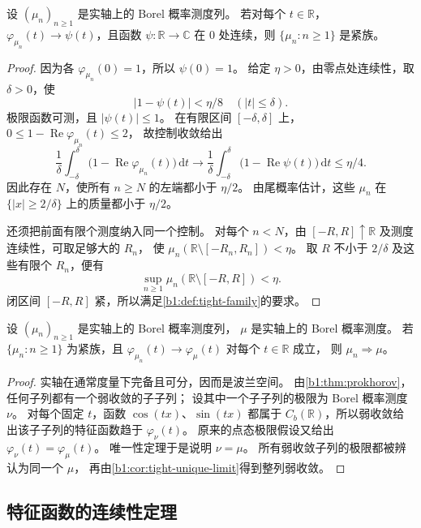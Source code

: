 \begin{lemma}\label{b1:lem:30-characteristic-tightness}
设 \((\mu_n)_{n\geq1}\) 是实轴上的 Borel 概率测度列。
若对每个 \(t\in\mathbb R\)，
\(\varphi_{\mu_n}(t)\to\psi(t)\)，且函数 \(\psi:\mathbb R\to\mathbb C\)
在 \(0\) 处连续，则 \(\{\mu_n:n\geq1\}\) 是紧族。
\end{lemma}
\begin{proof}
因为各 \(\varphi_{\mu_n}(0)=1\)，所以 \(\psi(0)=1\)。
给定 \(\eta>0\)，由零点处连续性，取 \(\delta>0\)，使
\[
 |1-\psi(t)|<\eta/8\quad(|t|\leq\delta).
\]
极限函数可测，且 \(|\psi(t)|\leq1\)。
在有限区间 \([-\delta,\delta]\) 上，
\(0\leq1-\operatorname{Re}\varphi_{\mu_n}(t)\leq2\)，
故控制收敛给出
\[
 \frac{1}{\delta}\int_{-\delta}^{\delta}
       \bigl(1-\operatorname{Re}\varphi_{\mu_n}(t)\bigr)\,\mathrm dt
 \longrightarrow
 \frac{1}{\delta}\int_{-\delta}^{\delta}
       \bigl(1-\operatorname{Re}\psi(t)\bigr)\,\mathrm dt
 \leq\eta/4.
\]
因此存在 \(N\)，使所有 \(n\geq N\) 的左端都小于 \(\eta/2\)。
由尾概率估计，这些 \(\mu_n\) 在
\(\{|x|\geq2/\delta\}\) 上的质量都小于 \(\eta/2\)。

还须把前面有限个测度纳入同一个控制。
对每个 \(n<N\)，由
\([-R,R]\uparrow\mathbb R\) 及测度连续性，可取足够大的 \(R_n\)，
使 \(\mu_n(\mathbb R\setminus[-R_n,R_n])<\eta\)。
取 \(R\) 不小于 \(2/\delta\) 及这些有限个 \(R_n\)，便有
\[
 \sup_{n\geq1}\mu_n(\mathbb R\setminus[-R,R])<\eta.
\]
闭区间 \([-R,R]\) 紧，所以满足\cref{b1:def:tight-family}的要求。
\end{proof}

\begin{proposition}\label{b1:prop:30-tight-characteristic-limit}
设 \((\mu_n)_{n\geq1}\) 是实轴上的 Borel 概率测度列，
\(\mu\) 是实轴上的 Borel 概率测度。
若 \(\{\mu_n:n\geq1\}\) 为紧族，且
\(\varphi_{\mu_n}(t)\to\varphi_\mu(t)\) 对每个 \(t\in\mathbb R\) 成立，
则 \(\mu_n\Rightarrow\mu\)。
\end{proposition}
\begin{proof}
实轴在通常度量下完备且可分，因而是波兰空间。
由\cref{b1:thm:prokhorov}，任何子列都有一个弱收敛的子子列；
设其中一个子子列的极限为 Borel 概率测度 \(\nu\)。
对每个固定 \(t\)，函数 \(\cos(tx)\)、\(\sin(tx)\) 都属于
\(C_b(\mathbb R)\)，所以弱收敛给出该子子列的特征函数趋于
\(\varphi_\nu(t)\)。
原来的点态极限假设又给出 \(\varphi_\nu(t)=\varphi_\mu(t)\)。
唯一性定理于是说明 \(\nu=\mu\)。
所有弱收敛子列的极限都被辨认为同一个 \(\mu\)，
再由\cref{b1:cor:tight-unique-limit}得到整列弱收敛。
\end{proof}

\subsection{特征函数的连续性定理}
\label{b1:subsec:300604}

